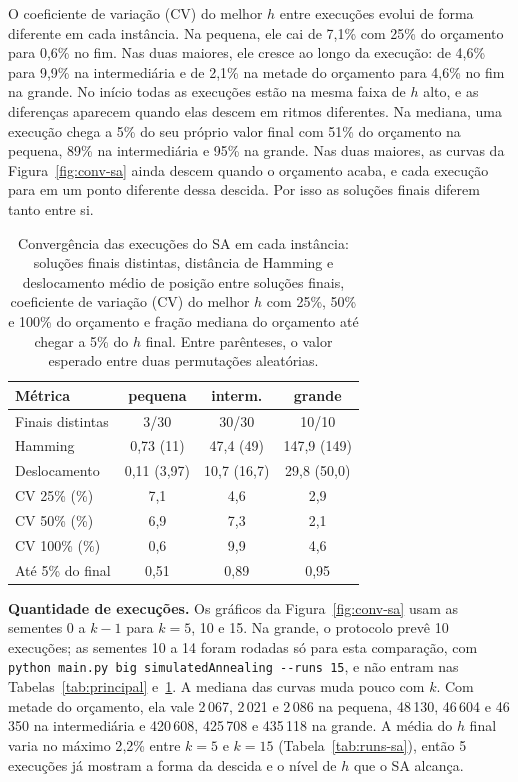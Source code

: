 O coeficiente de variação (CV) do melhor $h$ entre execuções evolui de forma diferente em cada instância. Na pequena, ele cai de 7{,}1\% com 25\% do orçamento para 0{,}6\% no fim. Nas duas maiores, ele cresce ao longo da execução: de 4{,}6\% para 9{,}9\% na intermediária e de 2{,}1\% na metade do orçamento para 4{,}6\% no fim na grande. No início todas as execuções estão na mesma faixa de $h$ alto, e as diferenças aparecem quando elas descem em ritmos diferentes. Na mediana, uma execução chega a 5\% do seu próprio valor final com 51\% do orçamento na pequena, 89\% na intermediária e 95\% na grande. Nas duas maiores, as curvas da Figura~\ref{fig:conv-sa} ainda descem quando o orçamento acaba, e cada execução para em um ponto diferente dessa descida. Por isso as soluções finais diferem tanto entre si.

\begin{table}[H]
\centering
\caption{Convergência das execuções do SA em cada instância: soluções finais distintas, distância de Hamming e deslocamento médio de posição entre soluções finais, coeficiente de variação (CV) do melhor $h$ com 25\%, 50\% e 100\% do orçamento e fração mediana do orçamento até chegar a 5\% do $h$ final. Entre parênteses, o valor esperado entre duas permutações aleatórias.}
\label{tab:conv-sa}
\small
\setlength{\tabcolsep}{4pt}
\begin{tabular}{lccc}
\toprule
Métrica & pequena & interm. & grande\\
\midrule
Finais distintas & 3/30 & 30/30 & 10/10\\
Hamming & 0{,}73 (11) & 47{,}4 (49) & 147{,}9 (149)\\
Deslocamento & 0{,}11 (3{,}97) & 10{,}7 (16{,}7) & 29{,}8 (50{,}0)\\
CV 25\% (\%) & 7{,}1 & 4{,}6 & 2{,}9\\
CV 50\% (\%) & 6{,}9 & 7{,}3 & 2{,}1\\
CV 100\% (\%) & 0{,}6 & 9{,}9 & 4{,}6\\
Até 5\% do final & 0{,}51 & 0{,}89 & 0{,}95\\
\bottomrule
\end{tabular}
\end{table}

\textbf{Quantidade de execuções.} Os gráficos da Figura~\ref{fig:conv-sa} usam as sementes 0 a $k-1$ para $k=5$, 10 e 15. Na grande, o protocolo prevê 10 execuções; as sementes 10 a 14 foram rodadas só para esta comparação, com \texttt{python main.py big simulatedAnnealing -{}-runs 15}, e não entram nas Tabelas~\ref{tab:principal} e~\ref{tab:conv-sa}. A mediana das curvas muda pouco com $k$. Com metade do orçamento, ela vale 2\,067, 2\,021 e 2\,086 na pequena, 48\,130, 46\,604 e 46\,350 na intermediária e 420\,608, 425\,708 e 435\,118 na grande. A média do $h$ final varia no máximo 2{,}2\% entre $k=5$ e $k=15$ (Tabela~\ref{tab:runs-sa}), então 5 execuções já mostram a forma da descida e o nível de $h$ que o SA alcança.

